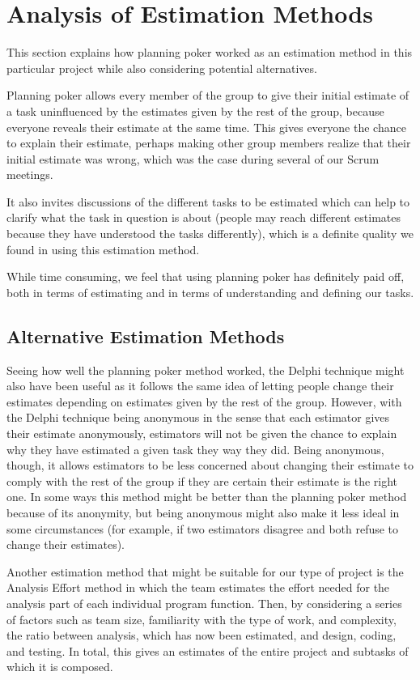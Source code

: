 \section{Analysis of Estimation Methods}
\label{sec:AnalysisEstimation}
This section explains how planning poker worked as an estimation method in this
particular project while also considering potential alternatives.

Planning poker allows every member of the group to give their initial estimate
of a task uninfluenced by the estimates given by the rest of the group, because
everyone reveals their estimate at the same time. This gives everyone the chance
to explain their estimate, perhaps making other group members realize that their
initial estimate was wrong, which was the case during several of our Scrum
meetings.

It also invites discussions of the different tasks to be estimated which can
help to clarify what the task in question is about (people may reach different
estimates because they have understood the tasks differently), which is a
definite quality we found in using this estimation method.

While time consuming, we feel that using planning poker has definitely paid off,
both in terms of estimating and in terms of understanding and defining our
tasks.

\subsection{Alternative Estimation Methods}
Seeing how well the planning poker method worked, the Delphi
technique\cite{caye} might also have been useful as it follows the same idea of
letting people change their estimates depending on estimates given by the rest
of the group. However, with the Delphi technique being anonymous in the sense
that each estimator gives their estimate anonymously, estimators will not be
given the chance to explain why they have estimated a given task they way they
did. Being anonymous, though, it allows estimators to be less concerned about
changing their estimate to comply with the rest of the group if they are certain
their estimate is the right one. In some ways this method might be better than
the planning poker method because of its anonymity, but being anonymous might
also make it less ideal in some circumstances (for example, if two estimators
disagree and both refuse to change their estimates).

Another estimation method that might be suitable for our type of project is the
Analysis Effort method\cite{caye} in which the team estimates the effort needed
for the analysis part of each individual program function. Then, by considering
a series of factors such as team size, familiarity with the type of work, and
complexity, the ratio between analysis, which has now been estimated, and
design, coding, and testing. In total, this gives an estimates of the entire
project and subtasks of which it is composed.

